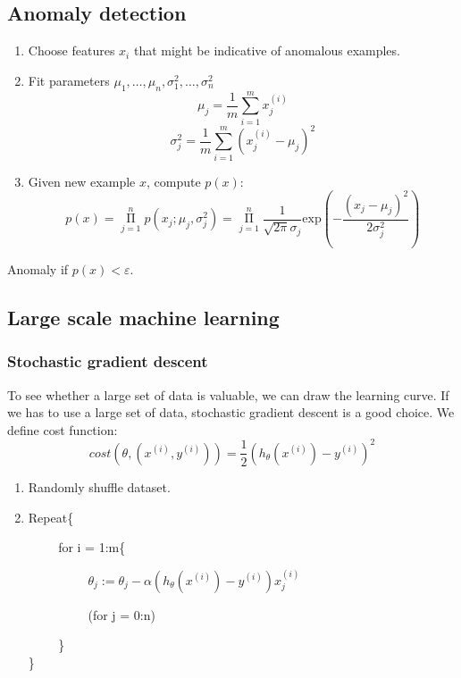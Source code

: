 \documentclass{article}
\begin{document}
\subsection{Anomaly detection}
\begin{enumerate}
  \item Choose features $x_i$ that might be indicative of anomalous examples.
  \item Fit parameters $\mu_1, \ldots, \mu_n, \sigma_1^2, \ldots, \sigma_n^2$
        \[\mu_j = \frac{1}{m}\sum\limits_{i=1}^mx_j^{(i)}\]
        \[\sigma_j^2 = \frac{1}{m}\sum\limits_{i=1}^m(x_j^{(i)} - \mu_j)^2\]
  \item Given new example $x$, compute $p(x)$:
        \[p(x) = \mathop{\Pi}\limits_{j=1}^np(x_j;\mu_j,\sigma_j^2) = \mathop{\Pi}\limits_{j=1}^n\frac{1}{\sqrt{2\pi}\sigma_j}\text{exp}(-\frac{(x_j - \mu_j)^2}{2\sigma_j^2})\]
\end{enumerate}
Anomaly if $p(x) < \varepsilon$.

\subsection{Large scale machine learning}
\subsubsection{Stochastic gradient descent}
To see whether a large set of data is valuable, we can draw the learning curve. If we has to use a large set of data, stochastic gradient descent is a good choice. We define cost function:\[cost(\theta,(x^{(i)},y^{(i)})) = \frac{1}{2}(h_{\theta}(x^{(i)}) - y^{(i)})^2\]
\begin{enumerate}
  \item Randomly shuffle dataset.
  \item Repeat\{\par
        $\hspace{1cm}$for i = 1:m\{\par
        $\hspace{2cm}$$\theta_j:=\theta_j-\alpha(h_\theta(x^{(i)})-y^{(i)})x_j^{(i)}$\par
        $\hspace{2cm}$(for j = 0:n)\par
        $\hspace{1cm}$\}\\
  \}
\end{enumerate}
\end{document}
